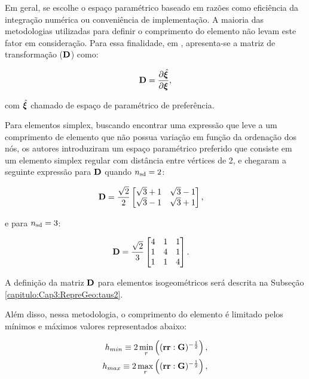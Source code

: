 \documentclass[tese_patricia]{subfiles}%
\begin{document}
Em geral, se escolhe o espaço paramétrico baseado em razões como eficiência da integração numérica ou conveniência de implementação. A maioria das metodologias utilizadas para definir o comprimento do elemento não levam este fator em consideração. Para essa finalidade, em , apresenta-se a matriz de transformação ($\mathbf{D}$) como:

\begin{align}
	\mathbf{D} = \frac{\partial{\hat{\bm{\xi}}}}{\partial{\bm{\xi}}},
\end{align}

\noindent com $\hat{\bm{\xi}}$ chamado de espaço de paramétrico de preferência.

Para elementos simplex, buscando encontrar uma expressão que leve a um comprimento de elemento que não possua variação em função da ordenação dos nós, os autores introduziram um espaço paramétrico preferido que consiste em um elemento simplex regular com distância entre vértices de 2, e chegaram a seguinte expressão para $\mathbf{D}$ quando ${n_{\mathrm{sd}}} = 2$:

\begin{align}
	\mathbf{D}&= \frac{\sqrt{2}}{2} \begin{bmatrix}
		\sqrt{3} + 1 & \sqrt{3} - 1 \\
		\sqrt{3} - 1 & \sqrt{3} + 1
	\end{bmatrix},
\end{align}

\noindent e para ${n_{\mathrm{sd}}} = 3$:

\begin{align}
	\mathbf{D}&= \frac{\sqrt{2}}{3} \begin{bmatrix}
		4 & 1 & 1 \\
		1 & 4 & 1 \\
		1 & 1 & 4
	\end{bmatrix}.
\end{align}


A definição da matriz $\mathbf{D}$ para elementos isogeométricos será descrita na Subseção \ref{capitulo:Cap3:RepreGeo:taus2}.

Além disso, nessa metodologia, o comprimento do elemento é limitado pelos mínimos e máximos valores representados abaixo:

\begin{align}
	h_{min} \equiv 2\min_{r}\left((\mathbf{r}\mathbf{r}:\mathbf{G})^{-\frac{1}{2}} \right), \\
	h_{max} \equiv 2\max_{r}\left((\mathbf{r}\mathbf{r}:\mathbf{G})^{-\frac{1}{2}} \right),
\end{align}
\end{document}
